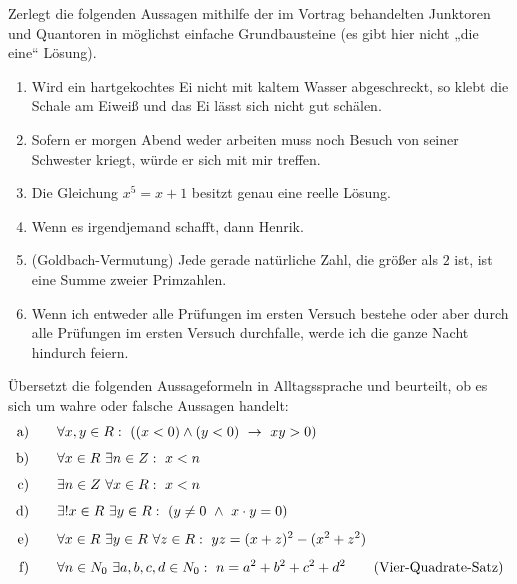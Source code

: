 \begin{aufg}
    Zerlegt die folgenden Aussagen mithilfe der im Vortrag behandelten Junktoren und Quantoren in möglichst einfache Grundbausteine (es gibt hier nicht „die eine“ Lösung).
    \begin{enumerate}
        \item Wird ein hartgekochtes Ei nicht mit kaltem Wasser abgeschreckt, so klebt die Schale am Eiweiß und das Ei lässt sich nicht gut schälen.
        \item Sofern er morgen Abend weder arbeiten muss noch Besuch von seiner Schwester kriegt, würde er sich mit mir treffen.
        \item Die Gleichung $x^5=x+1$ besitzt genau eine reelle Lösung.
        \item Wenn es irgendjemand schafft, dann Henrik.
        \item(Goldbach-Vermutung) Jede gerade natürliche Zahl, die größer als $2$ ist, ist eine Summe zweier Primzahlen.
        \item Wenn ich entweder alle Prüfungen im ersten Versuch bestehe oder aber durch alle Prüfungen im ersten Versuch durchfalle, werde ich die ganze Nacht hindurch feiern.
    \end{enumerate}
\end{aufg}


\begin{aufg}
    Übersetzt die folgenden Aussageformeln in Alltagssprache und beurteilt, ob es sich um wahre oder falsche Aussagen handelt:
    \begin{align*}
        \text{a)}&\qquad \forall x,y\in \R:\ ((x<0)\land (y<0)\ \to\ xy>0) \\[0.4em]
        \text{b)}&\qquad \forall x\in \R\ \exists n\in \Z:\ x<n \\[0.4em]
        \text{c)}&\qquad \exists n\in \Z\ \forall x\in \R:\ x<n \\[0.4em]
        \text{d)}&\qquad \exists! x\in \R\ \exists y\in \R:\ (y\neq0\ \land\ x\cdot y=0) \\[0.4em]
        \text{e)}&\qquad \forall x\in \R\ \exists y\in \R\ \forall z\in \R:\ yz = (x+z)^2-(x^2+z^2) \\[0.4em]
        \text{f)}&\qquad \forall n\in\N_0\ \exists a,b,c,d\in \N_0:\ n=a^2+b^2+c^2+d^2 \tag{Vier-Quadrate-Satz}
    \end{align*}
\end{aufg}
	
